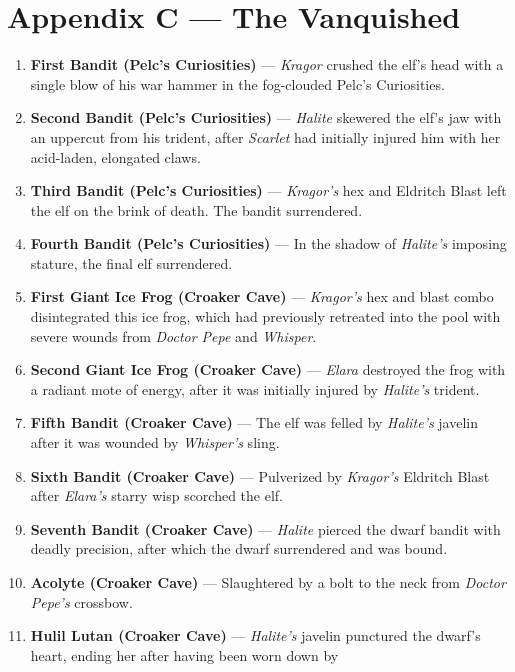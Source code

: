 \documentclass[
  letterpaper,12pt,twoside,twocolumn,openany,
  nodeprecatedcode,bg=full]{dndbook}
\begin{document}
\chapter{Appendix C --- The Vanquished}\label{appendix-c-the-vanquished}

\begin{enumerate}
\def\labelenumi{\arabic{enumi}.}
\item
  \textbf{First Bandit (Pelc's Curiosities)} --- \emph{Kragor} crushed
  the elf's head with a single blow of his war hammer in the fog-clouded
  Pelc's Curiosities.
\item
  \textbf{Second Bandit (Pelc's Curiosities)} --- \emph{Halite} skewered
  the elf's jaw with an uppercut from his trident, after \emph{Scarlet}
  had initially injured him with her acid-laden, elongated claws.
\item
  \textbf{Third Bandit (Pelc's Curiosities)} --- \emph{Kragor's} hex and
  Eldritch Blast left the elf on the brink of death. The bandit
  surrendered.
\item
  \textbf{Fourth Bandit (Pelc's Curiosities)} --- In the shadow of
  \emph{Halite's} imposing stature, the final elf surrendered.
\item
  \textbf{First Giant Ice Frog (Croaker Cave)} --- \emph{Kragor's} hex
  and blast combo disintegrated this ice frog, which had previously
  retreated into the pool with severe wounds from \emph{Doctor Pepe} and
  \emph{Whisper}.
\item
  \textbf{Second Giant Ice Frog (Croaker Cave)} --- \emph{Elara}
  destroyed the frog with a radiant mote of energy, after it was
  initially injured by \emph{Halite's} trident.
\item
  \textbf{Fifth Bandit (Croaker Cave)} --- The elf was felled by
  \emph{Halite's} javelin after it was wounded by \emph{Whisper's}
  sling.
\item
  \textbf{Sixth Bandit (Croaker Cave)} --- Pulverized by \emph{Kragor's}
  Eldritch Blast after \emph{Elara's} starry wisp scorched the elf.
\item
  \textbf{Seventh Bandit (Croaker Cave)} --- \emph{Halite} pierced the
  dwarf bandit with deadly precision, after which the dwarf surrendered
  and was bound.
\item
  \textbf{Acolyte (Croaker Cave)} --- Slaughtered by a bolt to the neck
  from \emph{Doctor Pepe's} crossbow.
\item
  \textbf{Hulil Lutan (Croaker Cave)} --- \emph{Halite's} javelin
  punctured the dwarf's heart, ending her after having been worn down by

\end{enumerate}
\end{document}
